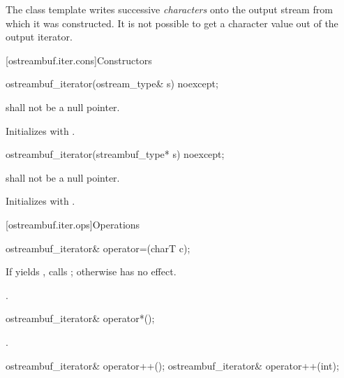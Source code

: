 \pnum
The
class template
writes successive
\textit{characters}
onto the output stream from which it was constructed.
It is not possible to get a character value out of the output iterator.

[ostreambuf.iter.cons]{Constructors}

%
\begin{itemdecl}
ostreambuf_iterator(ostream_type& s) noexcept;
\end{itemdecl}

\begin{itemdescr}
\pnum
\requires
{}
shall not be a null pointer.

\pnum
\effects
Initializes  with .
\end{itemdescr}


%
\begin{itemdecl}
ostreambuf_iterator(streambuf_type* s) noexcept;
\end{itemdecl}

\begin{itemdescr}
\pnum
\requires
{}
shall not be a null pointer.

\pnum
\effects
Initializes  with .
\end{itemdescr}

[ostreambuf.iter.ops]{Operations}

%
\begin{itemdecl}
ostreambuf_iterator& operator=(charT c);
\end{itemdecl}

\begin{itemdescr}
\pnum
\effects
If
yields
,
calls
;
otherwise has no effect.

\pnum
\returns
{}.
\end{itemdescr}

%
\begin{itemdecl}
ostreambuf_iterator& operator*();
\end{itemdecl}

\begin{itemdescr}
\pnum
\returns
{}.
\end{itemdescr}

%
\begin{itemdecl}
ostreambuf_iterator& operator++();
ostreambuf_iterator& operator++(int);
\end{itemdecl}

